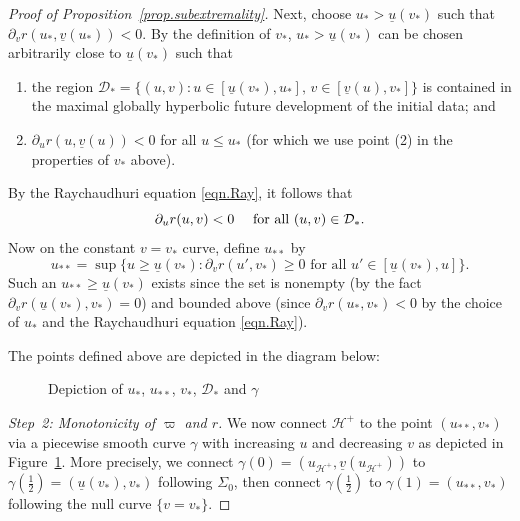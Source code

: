 \documentclass[10pt, reqno]{amsart}
\theoremstyle{definition}
\theoremstyle{remark}
\numberwithin{equation}{section}
\newcommand{\set}[1]{\{#1\}}
\newcommand{\rd}{\partial}
\newcommand{\0}{\emptyset}
\newcommand{\gmm}{\gamma}
\newcommand{\Sgm}{\Sigma}
\newcommand{\calD}{\mathcal D}
\newcommand{\calH}{\mathcal H}
\newcommand{\EH}{\calH^{+}}
\newcommand{\pfstep}[1]{\vspace{.5em} {\it \noindent #1.}}
\newcommand{\ub}{\underline{u}}
\begin{document}
\begin{proof}[Proof of Proposition~\ref{prop.subextremality}]
Next, choose $u_*>\ub(v_*)$ such that $\rd_v r(u_*, \underline{v}(u_*))<0$. By the definition of $v_*$, $u_*> \ub(v_*)$ can be chosen arbitrarily close to $\ub(v_*)$ such that 
\begin{enumerate}
\item the region $\calD_{*} =\{(u,v): u\in [\ub(v_*), u_*],\, v\in [\underline{v}(u), v_{*}]\}$ is contained in the maximal globally hyperbolic future development of the initial data; and
\item $\rd_u r(u, \underline{v}(u))<0$ for all $u\leq u_*$ (for which we use point (2) in the properties of $v_*$ above).
\end{enumerate}
By the Raychaudhuri equation \eqref{eqn.Ray}, it follows that
\begin{equation}\label{dur<0.u**}
\rd_u r (u, v) < 0 \quad \hbox{ for all } (u, v) \in \calD_{\ast}.
\end{equation}
Now on the constant $v=v_*$ curve, define $u_{**}$ by
$$u_{**}=\sup \{ u\geq \ub(v_*): \rd_v r (u',v_*)\geq 0 \mbox{ for all }u'\in [\ub(v_*), u]\}.$$ 
Such an $u_{**}\geq \ub(v_*)$ exists since the set is nonempty (by the fact $\rd_v r (\ub(v_*),v_*)=0$) and bounded above (since $\rd_v r (u_*, v_*)<0$ by the choice of $u_*$ and the Raychaudhuri equation \eqref{eqn.Ray}). 

The points defined above are depicted in the diagram below:

\begin{figure}[h] 
\begin{center}
\def\svgwidth{150px}
 
\caption{Depiction of $u_{*}$, $u_{**}$, $v_{*}$, $\calD_{*}$ and $\gmm$} \label{fig:subextremality}
\end{center}
\end{figure}

\pfstep{Step~2: Monotonicity of $\varpi$ and $r$}
We now connect $\EH$ to the point $(u_{**}, v_*)$ via a piecewise smooth curve $\gamma$ with increasing $u$ and decreasing $v$ as depicted in Figure~\ref{fig:subextremality}. More precisely, we connect $\gmm(0) = (u_{\EH}, \underline{v}(u_{\EH}))$ to $\gmm(\frac{1}{2}) = (\ub(v_*), v_*)$ following $\Sgm_{0}$, then connect $\gmm(\frac{1}{2})$ to $\gmm(1) = (u_{**}, v_{*})$ following the null curve $\set{v = v_{*}}$. 


\end{proof}
\end{document}
